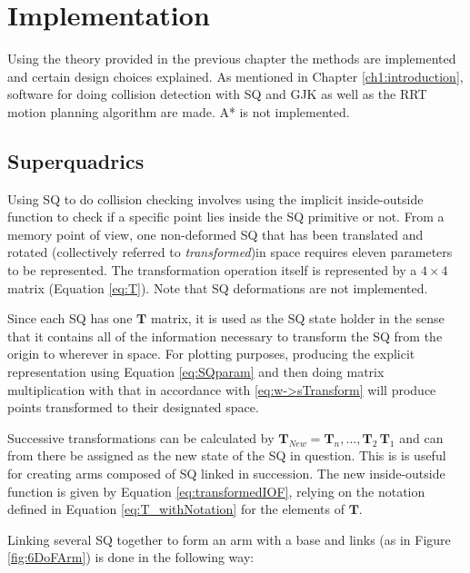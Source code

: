 \chapter{Implementation} \label{ch3:implement}

Using the theory provided in the previous chapter the methods are implemented and certain design choices explained. As mentioned in Chapter \ref{ch1:introduction}, software for doing collision detection with \gls{SQ} and \gls{GJK} as well as the \gls{RRT} motion planning algorithm are made. A* is not implemented.

\section{Superquadrics}

Using \gls{SQ} to do collision checking involves using the implicit inside-outside function to check if a specific point lies inside the \gls{SQ} primitive or not. From a memory point of view, one non-deformed \gls{SQ} that has been translated and rotated (collectively referred to \textit{transformed})in space requires eleven parameters to be represented. The transformation operation itself is represented by a $4 \times 4$ matrix (Equation \ref{eq:T}). Note that \gls{SQ} deformations are not implemented.

Since each \gls{SQ} has one $\textbf{T}$ matrix, it is used as the \gls{SQ} state holder in the sense that it contains all of the information necessary to transform the \gls{SQ} from the origin to wherever in space. For plotting purposes, producing the explicit representation using Equation \ref{eq:SQparam} and then doing matrix multiplication with that in accordance with \ref{eq:w->sTransform} will produce points transformed to their designated space. 

Successive transformations can be calculated by $\textbf{T}_{New} = \textbf{T}_n,\dots,\textbf{T}_2\,\textbf{T}_1$ and can from there be assigned as the new state of the \gls{SQ} in question. This is is useful for creating arms composed of \gls{SQ} linked in succession. The new inside-outside function is given by Equation \ref{eq:transformedIOF}, relying on the notation defined in Equation \ref{eq:T_withNotation} for the elements of $\textbf{T}$.

Linking several \gls{SQ} together to form an arm with a base and links (as in Figure \ref{fig:6DoFArm}) is done in the following way:

